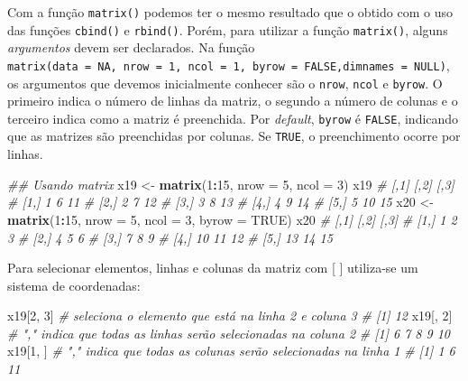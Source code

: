 \documentclass[
]{book}
\newenvironment{Shaded}{\begin{snugshade}}{\end{snugshade}}
\newcommand{\CommentTok}[1]{\textcolor[rgb]{0.56,0.35,0.01}{\textit{#1}}}
\newcommand{\DataTypeTok}[1]{\textcolor[rgb]{0.13,0.29,0.53}{#1}}
\newcommand{\DecValTok}[1]{\textcolor[rgb]{0.00,0.00,0.81}{#1}}
\newcommand{\KeywordTok}[1]{\textcolor[rgb]{0.13,0.29,0.53}{\textbf{#1}}}
\newcommand{\NormalTok}[1]{#1}
\newcommand{\OperatorTok}[1]{\textcolor[rgb]{0.81,0.36,0.00}{\textbf{#1}}}
\newcommand{\OtherTok}[1]{\textcolor[rgb]{0.56,0.35,0.01}{#1}}
\newcommand{\StringTok}[1]{\textcolor[rgb]{0.31,0.60,0.02}{#1}}
\begin{document}
Com a função \texttt{matrix()}  podemos ter o mesmo resultado que o obtido com o uso das funções \texttt{cbind()} e \texttt{rbind()}. Porém, para utilizar a função \texttt{matrix()}, alguns \emph{argumentos} devem ser declarados. Na função \texttt{matrix(data\ =\ NA,\ nrow\ =\ 1,\ ncol\ =\ 1,\ byrow\ =\ FALSE,dimnames\ =\ NULL)}, os argumentos que devemos inicialmente conhecer são o \texttt{nrow}, \texttt{ncol} e \texttt{byrow}. O primeiro indica o número de linhas da matriz, o segundo a número de colunas e o terceiro indica como a matriz é preenchida. Por \emph{default}, \texttt{byrow} é \texttt{FALSE}, indicando que as matrizes são preenchidas por colunas. Se \texttt{TRUE}, o preenchimento ocorre por linhas.

\begin{Shaded}
\begin{Highlighting}[]
\CommentTok{## Usando matrix}
\NormalTok{x19 <-}\StringTok{ }\KeywordTok{matrix}\NormalTok{(}\DecValTok{1}\OperatorTok{:}\DecValTok{15}\NormalTok{, }\DataTypeTok{nrow =} \DecValTok{5}\NormalTok{, }\DataTypeTok{ncol =} \DecValTok{3}\NormalTok{)}
\NormalTok{x19}
\CommentTok{#      [,1] [,2] [,3]}
\CommentTok{# [1,]    1    6   11}
\CommentTok{# [2,]    2    7   12}
\CommentTok{# [3,]    3    8   13}
\CommentTok{# [4,]    4    9   14}
\CommentTok{# [5,]    5   10   15}
\NormalTok{x20 <-}\StringTok{ }\KeywordTok{matrix}\NormalTok{(}\DecValTok{1}\OperatorTok{:}\DecValTok{15}\NormalTok{, }\DataTypeTok{nrow =} \DecValTok{5}\NormalTok{, }\DataTypeTok{ncol =} \DecValTok{3}\NormalTok{, }\DataTypeTok{byrow =} \OtherTok{TRUE}\NormalTok{)}
\NormalTok{x20}
\CommentTok{#      [,1] [,2] [,3]}
\CommentTok{# [1,]    1    2    3}
\CommentTok{# [2,]    4    5    6}
\CommentTok{# [3,]    7    8    9}
\CommentTok{# [4,]   10   11   12}
\CommentTok{# [5,]   13   14   15}
\end{Highlighting}
\end{Shaded}

Para selecionar elementos, linhas e colunas da matriz com {[} {]} utiliza-se um sistema de coordenadas:

\begin{Shaded}
\begin{Highlighting}[]
\NormalTok{x19[}\DecValTok{2}\NormalTok{, }\DecValTok{3}\NormalTok{] }\CommentTok{# seleciona o elemento que está na linha 2 e coluna 3}
\CommentTok{# [1] 12}
\NormalTok{x19[, }\DecValTok{2}\NormalTok{] }\CommentTok{# "," indica que todas as linhas serão selecionadas na coluna 2}
\CommentTok{# [1]  6  7  8  9 10}
\NormalTok{x19[}\DecValTok{1}\NormalTok{, ] }\CommentTok{# "," indica que todas as colunas serão selecionadas na linha 1}
\CommentTok{# [1]  1  6 11}
\end{Highlighting}
\end{Shaded}
\end{document}
